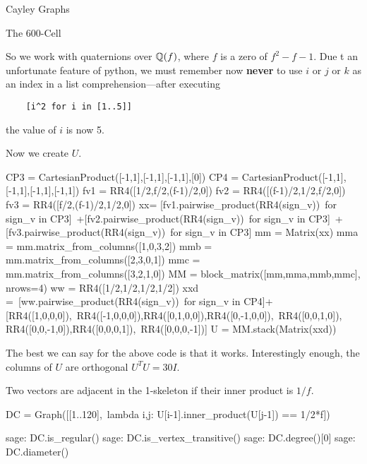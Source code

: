 \begin{chap}{Cayley Graphs}
\begin{sect}{The 600-Cell}
\begin{para}
So we work with quaternions over ${\mathbb Q}(f)$, where $f$ is a zero of $f^2-f-1$.
Due t an unfortunate feature of python, we must remember now \textbf{never}
to use $i$ or $j$ or $k$ as an index in a list comprehension---after
executing
\end{para}
%
\begin{verbatim}
    [i^2 for i in [1..5]]
\end{verbatim}
%
\begin{para}
the value of $i$ is now 5.
\end{para}
%
\begin{para}
Now we create $U$. 
\end{para}
%
\begin{sageblock}    
    CP3 = CartesianProduct([-1,1],[-1,1],[-1,1],[0])
    CP4 = CartesianProduct([-1,1],[-1,1],[-1,1],[-1,1])
    fv1 = RR4([1/2,f/2,(f-1)/2,0])
    fv2 = RR4([(f-1)/2,1/2,f/2,0])
    fv3 = RR4([f/2,(f-1)/2,1/2,0])
    xx= [fv1.pairwise_product(RR4(sign_v))\
      for sign_v in CP3]\
     +[fv2.pairwise_product(RR4(sign_v))\
      for sign_v in CP3]\
     +[fv3.pairwise_product(RR4(sign_v))\
      for sign_v in CP3]
    mm = Matrix(xx)
    mma = mm.matrix_from_columns([1,0,3,2])
    mmb = mm.matrix_from_columns([2,3,0,1])
    mmc = mm.matrix_from_columns([3,2,1,0])
    MM = block_matrix([mm,mma,mmb,mmc], nrows=4)
    ww = RR4([1/2,1/2,1/2,1/2])
    xxd =\ 
      [ww.pairwise_product(RR4(sign_v))\
      for sign_v in CP4]+[RR4([1,0,0,0]),\  
      RR4([-1,0,0,0]),RR4([0,1,0,0]),RR4([0,-1,0,0]),\ 
      RR4([0,0,1,0]), RR4([0,0,-1,0]),RR4([0,0,0,1]),\
      RR4([0,0,0,-1])]
    U = MM.stack(Matrix(xxd))
\end{sageblock}
%
\begin{para}
The best we can say for the above code is that it works. Interestingly
enough, the columns of $U$ are orthogonal $U^TU =30I$.
\end{para}
%
\begin{para}
Two vectors are adjacent in the 1-skeleton if their inner product is $1/f$.
\end{para}
%
\begin{sageblock}
    DC = Graph([[1..120],\
     lambda i,j: U[i-1].inner_product(U[j-1]) == 1/2*f])
\end{sageblock}
%
\begin{sageexample}
sage: DC.is_regular()
sage: DC.is_vertex_transitive()
sage: DC.degree()[0]
sage: DC.diameter()
\end{sageexample}
%
\begin{para}

\end{para}
\end{sect}
\end{chap}
